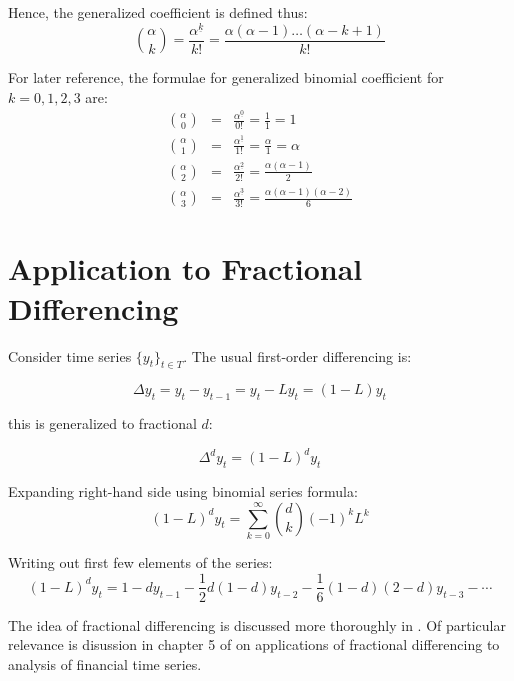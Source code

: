 \documentclass[12pt]{article}
\begin{document}
Hence, the generalized coefficient is defined thus:
\begin{equation*}
\binom{\alpha}{k} = 
\frac{\alpha^{\underline{k}}}{k!} = 
\frac{ \alpha (\alpha - 1) \dots (\alpha - k + 1) }{k!}
\end{equation*}

For later reference, the formulae for generalized binomial coefficient for $k = 0, 1, 2, 3$ are:
\begin{eqnarray*}
\binom{\alpha}{0} &=& \frac{\alpha^{\underline{0}}}{0!} = \frac{1}{1} = 1 \\
\binom{\alpha}{1} &=& \frac{\alpha^{\underline{1}}}{1!} = \frac{\alpha}{1} = \alpha \\
\binom{\alpha}{2} &=& \frac{\alpha^{\underline{2}}}{2!} = \frac{\alpha(\alpha - 1)}{2} \\
\binom{\alpha}{3} &=& \frac{\alpha^{\underline{3}}}{3!} = \frac{\alpha(\alpha - 1)(\alpha-2)}{6}
\end{eqnarray*}


\section{Application to Fractional Differencing}
Consider time series $\{ y_t \}_{t \in T}$. The usual first-order differencing is:

\begin{equation*}
\Delta y_t = y_t - y_{t-1} = y_t - L y_t = (1-L) y_t
\end{equation*}

this is generalized to fractional $d$:

\begin{equation*}
\Delta^{d}y_t = (1-L)^d y_t
\end{equation*}

Expanding right-hand side using binomial series formula:
\begin{equation*}
(1-L)^d y_t = \sum_{k=0}^{\infty} \binom{d}{k} (-1)^k L^k
\end{equation*}

Writing out first few elements of the series:
\begin{equation*}
(1-L)^d y_t = 1 - d y_{t-1} - \frac{1}{2}d(1-d)y_{t-2} - \frac{1}{6}(1-d)(2-d)y_{t-3} - \cdots
\end{equation*}


The idea of fractional differencing is discussed more thoroughly in \cite{fractional_differencing_hosking}. Of particular relevance is disussion in chapter 5 of \cite{fuller_intro_tsa} on applications of fractional differencing to analysis of financial time series.



\end{document}
